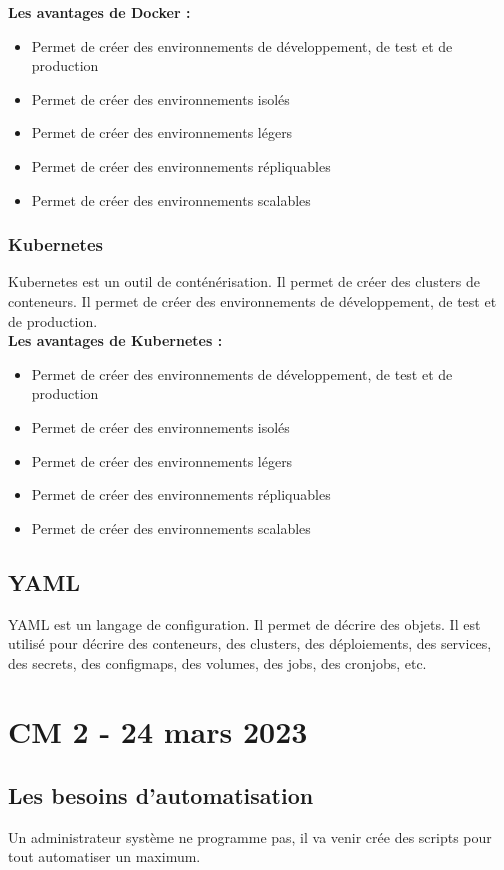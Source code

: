 \documentclass[12pt, a4paper]{article}
\begin{document}
\textbf{Les avantages de Docker :}\\
\begin{itemize}
    \item Permet de créer des environnements de développement, de test et de production
    \item Permet de créer des environnements isolés
    \item Permet de créer des environnements légers
    \item Permet de créer des environnements répliquables
    \item Permet de créer des environnements scalables
\end{itemize}

\newpage
\subsubsection{Kubernetes}
Kubernetes est un outil de conténérisation. Il permet de créer des clusters
de conteneurs. Il permet de créer des environnements de développement, de test
et de production.\\

\textbf{Les avantages de Kubernetes :}\\
\begin{itemize}
    \item Permet de créer des environnements de développement, de test et de production
    \item Permet de créer des environnements isolés
    \item Permet de créer des environnements légers
    \item Permet de créer des environnements répliquables
    \item Permet de créer des environnements scalables
\end{itemize}

\subsection{YAML}
YAML est un langage de configuration. Il permet de décrire des objets. Il est
utilisé pour décrire des conteneurs, des clusters, des déploiements, des
services, des secrets, des configmaps, des volumes, des jobs, des cronjobs,
etc.\\

\newpage
\section{CM 2 - 24 mars 2023}
\subsection{Les besoins d'automatisation}
Un administrateur système ne programme pas, il va venir crée des scripts
pour tout automatiser un maximum. 
\end{document}
